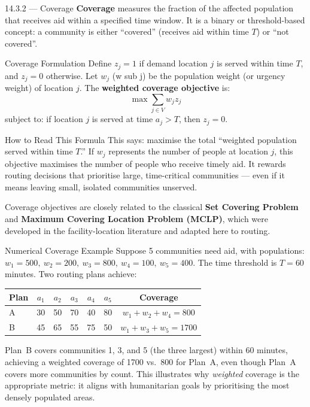 \documentclass[aspectratio=169,10pt]{beamer}
\begin{document}
\begin{frame}[allowframebreaks]{14.3.2 --- Coverage}
  \textbf{Coverage} measures the fraction of the affected population
  that receives aid within a specified time window.
  It is a binary or threshold-based concept: a community is either
  ``covered'' (receives aid within time $T$) or ``not covered''.

  \medskip
  \begin{block}{Coverage Formulation}
    Define $z_j = 1$ if demand location $j$ is served within time $T$,
    and $z_j = 0$ otherwise.
    Let $w_j$ (w sub j) be the population weight (or urgency weight)
    of location $j$.
    The \textbf{weighted coverage objective} is:
    \[
      \max \sum_{j \in V} w_j z_j
    \]
    subject to: if location $j$ is served at time $a_j > T$, then
    $z_j = 0$.
  \end{block}

  \begin{alertblock}{How to Read This Formula}
    This says: maximise the total ``weighted population served within
    time $T$.''
    If $w_j$ represents the number of people at location $j$,
    this objective maximises the number of people who receive timely aid.
    It rewards routing decisions that prioritise large, time-critical
    communities --- even if it means leaving small, isolated communities
    unserved.
  \end{alertblock}

  \framebreak

  Coverage objectives are closely related to the classical
  \textbf{Set Covering Problem} and \textbf{Maximum Covering
  Location Problem (MCLP)}, which were developed in the
  facility-location literature and adapted here to routing.

  \medskip
  \begin{exampleblock}{Numerical Coverage Example}
    Suppose 5 communities need aid, with populations:
    $w_1 = 500,\ w_2 = 200,\ w_3 = 800,\ w_4 = 100,\ w_5 = 400$.
    The time threshold is $T = 60$ minutes.
    Two routing plans achieve:
    \begin{center}
    \begin{tabular}{l ccccc c}
      \toprule
      Plan & $a_1$ & $a_2$ & $a_3$ & $a_4$ & $a_5$ & Coverage \\
      \midrule
      A & 30 & 50 & 70 & 40 & 80 & $w_1+w_2+w_4 = 800$ \\
      B & 45 & 65 & 55 & 75 & 50 & $w_1+w_3+w_5 = 1700$ \\
      \bottomrule
    \end{tabular}
    \end{center}
    Plan~B covers communities 1, 3, and 5 (the three largest) within
    60 minutes, achieving a weighted coverage of 1700 vs.\ 800 for
    Plan~A, even though Plan~A covers more communities by count.
    This illustrates why \emph{weighted} coverage is the appropriate
    metric: it aligns with humanitarian goals by prioritising
    the most densely populated areas.
  \end{exampleblock}


\end{frame}
\end{document}
